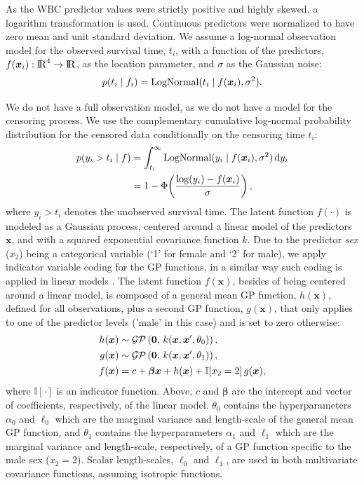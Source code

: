 As the WBC predictor values were strictly positive and highly skewed, a logarithm transformation is used. Continuous predictors were normalized to have zero mean and unit standard deviation.  
We assume a log-normal observation model for the observed survival time, $t_i$, with a function of the predictors, $f(\bm{x}_i):{\rm I\!R}^4 \to {\rm I\!R}$, as the location parameter, and $\sigma$ as the Gaussian noise: 
%
\begin{equation*}
  p(t_i \mid f_i)= \operatorname{LogNormal}(t_i \mid f(\bm{x}_i),\sigma^2).
\end{equation*}

We do not have a full observation model, as we do not have a model for the censoring process. We use the complementary cumulative log-normal probability distribution for the censored data conditionally on the censoring time $t_i$:
%
\begin{align*}
p(y_i > t_i \mid f) &= \int_{t_i}^{\infty} \operatorname{LogNormal}(y_i \mid f(\bm{x}_i),\sigma^2) \,\mathrm{d}y_i \\
&=  1 - \Phi\! \left( \frac{\log(y_i)-f(\bm{x}_i)}{\sigma} \right),
\end{align*}
%
where $y_i>t_i$ denotes the unobserved survival time.
The latent function $f(\cdot)$ is modeled as a Gaussian process, centered around a linear model of the predictors $\bm{x}$, and with a squared exponential covariance function $k$. Due to the predictor \textit{sex} ($x_2$) being a categorical variable (`1' for female and `2' for male), we apply indicator variable coding for the GP functions, in a similar way such coding is applied in linear models \citep{Gelman+Hill+Vehtari:2020:ROS}. The latent function $f(\bm{x})$, besides of being centered around a linear model, is composed of a general mean GP function, $h(\bm{x})$, defined for all observations, plus a second GP function, $g(\bm{x})$, that only applies to one of the predictor levels ('male' in this case) and is set to zero otherwise:
%
\begin{align*}
h(\bm{x}) &\sim \GP\left(\bm{0}, \, k(\bm{x},\bm{x}', \theta_0) \right),  \\[1pt] 
%
g(\bm{x}) &\sim \GP\left(\bm{0}, \, k(\bm{x},\bm{x}', \theta_1)\right),\\[1pt] 
%
f(\bm{x}) &= c + \bm{\beta} \bm{x} + h(\bm{x}) + \mathbb{I}\!\left[x_2=2\right]g(\bm{x}),
\end{align*}
%
where $\mathbb{I}\left[\cdot\right]$ is an indicator function. Above, $c$ and $\bm{\beta}$ are the intercept and vector of coefficients, respectively, of the linear model. $\theta_0$ contains the hyperparameters $\alpha_0$ and $\ell_0$ which are the marginal variance and length-scale of the general mean GP function, and $\theta_1$ contains the hyperparameters $\alpha_1$ and $\ell_1$ which are the marginal variance and length-scale, respectively, of a GP function specific to the male sex ($x_2=2$). Scalar length-scales, $\ell_0$ and $\ell_1$, are used in both multivariate covariance functions, assuming isotropic functions.
